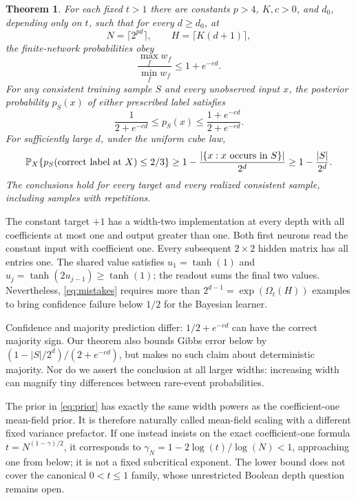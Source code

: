\documentclass[11pt]{article}
\newtheorem{theorem}{Theorem}[section]\newtheorem{lemma}[theorem]{Lemma}
\begin{document}
\begin{theorem}\label{thm:main}
For each fixed $t>1$ there are constants $p>4$, $K,c>0$, and $d_0$, depending only on $t$, such that for every $d\ge d_0$, at
\begin{equation}\label{eq:window}
 N=\lceil2^{pd}\rceil,\qquad H=\lceil K(d+1)\rceil,
\end{equation}
the finite-network probabilities obey
\begin{equation}\label{eq:ratio}
 \frac{\max_f w_f}{\min_f w_f}\le1+e^{-cd}.
\end{equation}
For any consistent training sample $S$ and every unobserved input $x$, the posterior probability $p_S(x)$ of either prescribed label satisfies
\begin{equation}\label{eq:posterior}
 \frac1{2+e^{-cd}}\le p_S(x)\le\frac{1+e^{-cd}}{2+e^{-cd}}.
\end{equation}
For sufficiently large $d$, under the uniform cube law,
\begin{equation}\label{eq:mistakes}
 \mathbb P_X\{p_S(\text{correct label at }X)\le2/3\}
 \ge1-\frac{|\{x:x\text{ occurs in }S\}|}{2^d}\ge1-\frac{|S|}{2^d}.
\end{equation}
The conclusions hold for every target and every realized consistent sample, including samples with repetitions.
\end{theorem}

The constant target $+1$ has a width-two implementation at every depth with all coefficients at most one and output greater than one. Both first neurons read the constant input with coefficient one. Every subsequent $2\times2$ hidden matrix has all entries one. The shared value satisfies $u_1=\tanh(1)$ and $u_j=\tanh(2u_{j-1})\ge\tanh(1)$; the readout sums the final two values. Nevertheless, \eqref{eq:mistakes} requires more than $2^{d-1}=\exp(\Omega_t(H))$ examples to bring confidence failure below $1/2$ for the Bayesian learner.

Confidence and majority prediction differ: $1/2+e^{-cd}$ can have the correct majority sign. Our theorem also bounds Gibbs error below by $(1-|S|/2^d)/(2+e^{-cd})$, but makes no such claim about deterministic majority. Nor do we assert the conclusion at all larger widths: increasing width can magnify tiny differences between rare-event probabilities.

The prior in \eqref{eq:prior} has exactly the same width powers as the coefficient-one mean-field prior. It is therefore naturally called mean-field scaling with a different fixed variance prefactor. If one instead insists on the exact coefficient-one formula $t=N^{(1-\gamma)/2}$, it corresponds to $\gamma_N=1-2\log(t)/\log(N)<1$, approaching one from below; it is not a fixed subcritical exponent. The lower bound does not cover the canonical $0<t\le1$ family, whose unrestricted Boolean depth question remains open.
\end{document}
